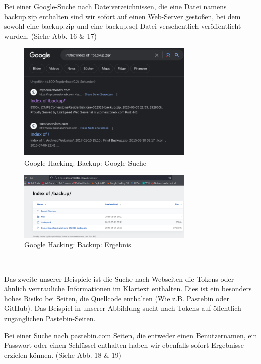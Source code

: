 \documentclass{article}
\begin{document}
Bei einer Google-Suche nach Dateiverzeichnissen, die eine Datei namens backup.zip enthalten
sind wir sofort auf einen Web-Server gestoßen, bei dem sowohl eine backup.zip und eine backup.sql
Datei versehentlich veröffentlicht wurden. (Siehe Abb. 16 \& 17)

\begin{figure}[H]
	\includegraphics[width=0.75\textwidth]{images/16}
	\centering
	\caption{Google Hacking: Backup: Google Suche}
\end{figure}

\begin{figure}[H]
	\includegraphics[width=0.75\textwidth]{images/17}
	\centering
	\caption{Google Hacking: Backup: Ergebnis}
\end{figure}

---

Das zweite unserer Beispiele ist die Suche nach Webseiten die Tokens oder ähnlich vertrauliche 
Informationen im Klartext enthalten. Dies ist ein besonders hohes Risiko bei Seiten, die 
Quellcode enthalten (Wie z.B. Pastebin oder GitHub). Das Beispiel in unserer Abbildung 
sucht nach Tokens auf öffentlich-zugänglichen Pastebin-Seiten.

Bei einer Suche nach pastebin.com Seiten, die entweder einen Benutzernamen, ein Passwort oder
einen Schlüssel enthalten haben wir ebenfalls sofort Ergebnisse erzielen können.
(Siehe Abb. 18 \& 19)
\end{document}
